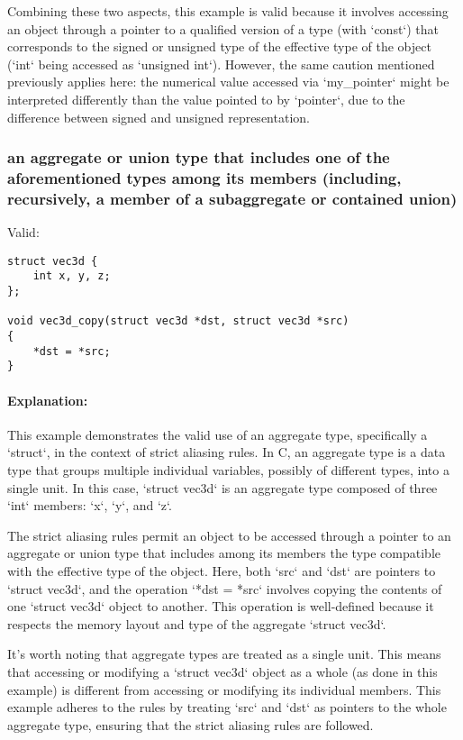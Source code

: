 \documentclass[12pt]{article}
\begin{document}
Combining these two aspects, this example is valid because it involves accessing an object through a pointer to a qualified version of a type (with `const`) that corresponds to the signed or unsigned type of the effective type of the object (`int` being accessed as `unsigned int`). However, the same caution mentioned previously applies here: the numerical value accessed via `my\_pointer` might be interpreted differently than the value pointed to by `pointer`, due to the difference between signed and unsigned representation.

\subsubsection{an aggregate or union type that includes one of the aforementioned types among its members (including, recursively, a member of a subaggregate or contained union)}

Valid:
\begin{lstlisting}
struct vec3d {
    int x, y, z;
};

void vec3d_copy(struct vec3d *dst, struct vec3d *src)
{
    *dst = *src;
}
\end{lstlisting}

\paragraph{Explanation:}
This example demonstrates the valid use of an aggregate type, specifically a `struct`, in the context of strict aliasing rules. In C, an aggregate type is a data type that groups multiple individual variables, possibly of different types, into a single unit. In this case, `struct vec3d` is an aggregate type composed of three `int` members: `x`, `y`, and `z`.

The strict aliasing rules permit an object to be accessed through a pointer to an aggregate or union type that includes among its members the type compatible with the effective type of the object. Here, both `src` and `dst` are pointers to `struct vec3d`, and the operation `*dst = *src` involves copying the contents of one `struct vec3d` object to another. This operation is well-defined because it respects the memory layout and type of the aggregate `struct vec3d`.

It's worth noting that aggregate types are treated as a single unit. This means that accessing or modifying a `struct vec3d` object as a whole (as done in this example) is different from accessing or modifying its individual members. This example adheres to the rules by treating `src` and `dst` as pointers to the whole aggregate type, ensuring that the strict aliasing rules are followed.
\end{document}
